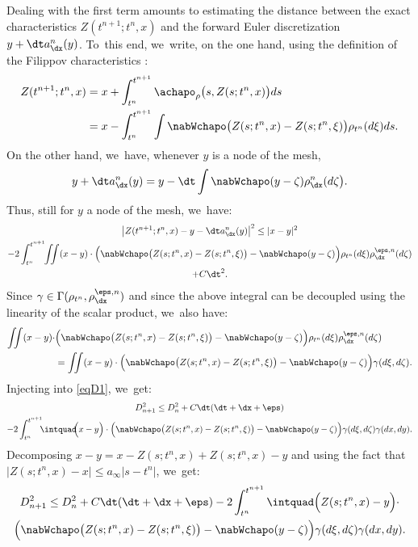 Dealing with the first term amounts to estimating the distance between the exact characteristics $Z(t^{n+1};t^n,x)$ and the forward Euler discretization $y+\dt a^n_{\dx}(y)$. To~this end, we~write, on the one hand, using the definition of the Filippov characteristics \cite{filippov88, poupaud_rascle97}:
\begin{align*}
Z(t^{n+1};t^n,x) & = x + \int_{t^n}^{t^{n+1}} \achapo_\rho\bigl(s,Z(s;t^n,x)\bigr) ds
\\
& = x - \int_{t^n}^{t^{n+1}} \int\nabWchapo\bigl(Z(s;t^n,x)-Z(s;t^n,\xi)\bigr) \rho_{t^n}(d\xi) ds.
\end{align*}
On the other hand, we~have, whenever $y$ is a node of the mesh,
\begin{equation*}
y + \dt a^n_{\dx}(y)
= y - \dt \int
\nabWchapo( y - \zeta) \rho^n_{\dx}( d \zeta \bigr).
\end{equation*}
Thus, still for $y$ a node of the mesh, we~have:
\begin{multline*}
\bigl|Z(t^{n+1};t^n,x)-y-\dt a^n_{\dx}(y)\bigr|^2 \leq |x-y|^2 \\
- 2\int_{t^n}^{t^{n+1}}\!\!\iint(x-y) \cdot \Big(\nabWchapo\big(Z(s;t^n,x)-Z(s;t^n,\xi)\big)-\nabWchapo(y-\zeta)\Big) \rho_{t^n}(d\xi) \rho_{\dx}^{\eps,n}(d\zeta) \\
+ C\dt^2.
\end{multline*}
Since $\gamma\in \Gamma(\rho_{t^n},\rho_{\dx}^{\eps,n})$ and since the above integral can be decoupled using the linearity of the scalar product, we~also have:
\begin{align*}
\iint(x-y) \cdot & \Big(\nabWchapo\big(Z(s;t^n,x)-Z(s;t^n,\xi)\big)-\nabWchapo(y-\zeta)\Big) \rho_{t^n}(d\xi) \rho_{\dx}^{\eps,n}(d\zeta) \\
& = \iint(x-y) \cdot \Big(\nabWchapo\big(Z(s;t^n,x)-Z(s;t^n,\xi)\big)-\nabWchapo(y-\zeta)\Big) \gamma(d\xi,d\zeta).
\end{align*}
Injecting into \eqref{eqD1}, we~get:
\begin{multline*}
D_{n+1}^2 \leq D_n^2 + C \dt(\dt+\dx+\eps) \\
- 2 \int_{t^n}^{t^{n+1}} \!\!\! \intquad \!\!\Big(x-y\Big) \cdot \Big(\nabWchapo\big(Z(s;t^n,x)-Z(s;t^n,\xi)\big)-\nabWchapo(y-\zeta)\Big) \gamma(d\xi,d\zeta) \gamma(dx,dy).
\end{multline*}
Decomposing $x-y=x-Z(s;t^n,x)+Z(s;t^n,x)-y$ and using the fact that \\
$|Z(s;t^n,x)-x|\leq a_\infty |s-t^n|$, we~get:
\begin{multline*}
D_{n+1}^2 \leq D_n^2 + C \dt(\dt+\dx+\eps)
- 2 \int_{t^n}^{t^{n+1}}\intquad \Big( Z(s;t^n,x)-y\Big) \cdot \\
\Big( \nabWchapo\bigl(Z(s;t^n,x) - Z(s;t^n,\xi)\bigr)-\nabWchapo(y-\zeta)\Big)
\gamma(d\xi,d\zeta) \gamma(dx,dy).
\end{multline*}
